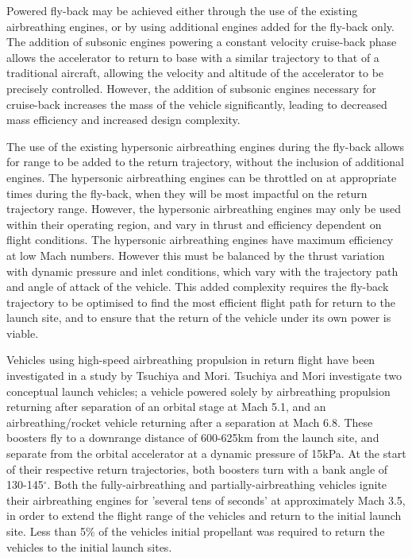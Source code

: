 \documentclass[conf]{new-aiaa}
\begin{document}
Powered fly-back may be achieved either through the use of the existing airbreathing engines, or by using additional engines added for the fly-back only\cite{Mehta2001,Hellman,Wilhite1991}. 
The addition of subsonic engines powering a constant velocity cruise-back phase allows the accelerator to return to base with a similar trajectory to that of a traditional aircraft, allowing the velocity and altitude of the accelerator to be precisely controlled. However, the addition of subsonic engines necessary for cruise-back increases the mass of the vehicle significantly, leading to decreased mass efficiency and increased design complexity\cite{Hellman}. 

The use of the existing hypersonic airbreathing engines during the fly-back allows for range to be added to the return trajectory, without the inclusion of additional engines. The hypersonic airbreathing engines can be throttled on at appropriate times during the fly-back, when they will be most impactful on the return trajectory range. However, the hypersonic airbreathing engines may only be used within their operating region, and vary in thrust and efficiency dependent on flight conditions. The hypersonic airbreathing engines have maximum efficiency at low Mach numbers\cite{Preller2017}. However this must be balanced by the thrust variation with dynamic pressure and inlet conditions, which vary with the trajectory path and angle of attack of the vehicle. This added complexity requires the fly-back trajectory to be optimised to find the most efficient flight path for return to the launch site, and to ensure that the return of the vehicle under its own power is viable. 


Vehicles using high-speed airbreathing propulsion in return flight have been investigated in a study by Tsuchiya and Mori\cite{Tsuchiya2005}.  Tsuchiya and Mori investigate two conceptual launch vehicles; a vehicle powered solely by airbreathing propulsion returning after separation of an orbital stage at Mach 5.1, and an airbreathing/rocket vehicle returning after a separation at Mach 6.8\cite{Tsuchiya2005}. 
These boosters fly to a downrange distance of 600-625km from the launch site, and separate from the orbital accelerator at a dynamic pressure of 15kPa\cite{Tsuchiya2005}. At the start of their respective return trajectories, both boosters turn with a bank angle of 130-145$^\circ$. Both the fully-airbreathing and partially-airbreathing vehicles ignite their airbreathing engines for 'several tens of seconds' at approximately Mach 3.5, in order to extend the flight range of the vehicles and return to the initial launch site\cite{Tsuchiya2005}. Less than 5\% of the vehicles initial propellant was required to return the vehicles to the initial launch sites\cite{Tsuchiya2005}.
\end{document}
